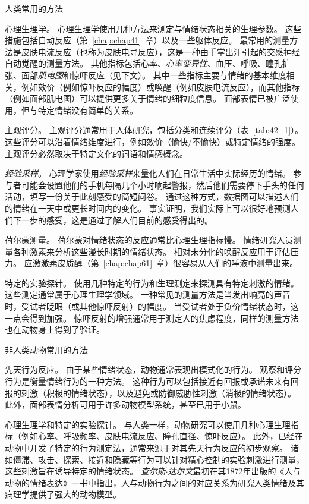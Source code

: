 \begin{proposition}[测量情绪的方法] \label{box:42_1}
	
	\quad \quad 人类常用的方法
	
	\quad \quad 心理生理学。
	心理生理学使用几种方法来测定与情绪状态相关的生理参数。
	这些措施包括自动反应（第~\ref{chap:chap41}~章）以及一些躯体反应。
	最常用的测量方法是皮肤电流反应（也称为皮肤电导反应），这是一种由手掌出汗引起的交感神经自动觉醒的测量方法。
	其他指标包括心率、\textit{心率变异性}、血压、呼吸、瞳孔扩张、面部\textit{肌电图}和惊吓反应（见下文）。
	其中一些指标主要与情绪的基本维度相关，例如效价（例如惊吓反应的幅度）或唤醒（例如皮肤电流反应），而其他指标（例如面部肌电图）可以提供更多关于情绪的细粒度信息。
	面部表情已被广泛使用，但与特定情绪没有简单的关系。
	
	\quad \quad 主观评分。
	主观评分通常用于人体研究，包括分类和连续评分（表~\ref{tab:42_1}）。
	这些评分可以沿着情绪维度进行，例如效价（愉快/不愉快）或特定情绪的强度。
	主观评分必然取决于特定文化的词语和情感概念。
	
	\quad \quad \textit{经验采样}。
	心理学家使用\textit{经验采样}来量化人们在日常生活中实际经历的情绪。
	参与者可能会设置他们的手机每隔几个小时响起警报，然后他们需要停下手头的任何活动，填写一份关于此刻感受的简短问卷。
	通过这种方式，数据图可以描述人们的情绪在一天中或更长时间内的变化。
	事实证明，我们实际上可以很好地预测人们下一步的感受，这是通过了解人们目前的感受得出的。
	
	\quad \quad 荷尔蒙测量。
	荷尔蒙对情绪状态的反应通常比心理生理指标慢。
	情绪研究人员测量各种激素来分析这些漫长时期的情绪状态。
	相对未分化的唤醒反应用于评估压力。
	应激激素皮质醇（第~\ref{chap:chap61}~章）很容易从人们的唾液中测量出来。
	
	\quad \quad 特定的实验探针。
	使用几种特定的行为和生理测定来探测具有特定刺激的情绪。
	这些测定通常属于心理生理学领域。
	一种常见的测量方法是当发出响亮的声音时，受试者眨眼（或其他惊吓反射）的幅度。
	当受试者处于负价情绪状态时，这一点会得到加强。
	惊吓反射的增强通常用于测定人的焦虑程度，同样的测量方法也在动物身上得到了验证。
	
	\quad \quad 非人类动物常用的方法
	
	\quad \quad 先天行为反应。
	由于某些情绪状态，动物通常表现出模式化的行为。
	观察和评分行为是衡量情绪行为的一种方法。
	这种行为可以包括接近有回报或承诺未来有回报的刺激（积极的情绪状态），以及避免或防御威胁性刺激（消极的情绪状态）。
	此外，面部表情分析可用于许多动物模型系统，甚至已用于小鼠。
	
	\quad \quad 心理生理学和特定的实验探针。
	与人类一样，动物研究可以使用几种心理生理指标（例如心率、呼吸频率、皮肤电流反应、瞳孔直径、惊吓反应）。
	此外，已经在动物中开发了特定的行为测定法，通常来源于对其先天行为反应的初步观察。
	诸如僵滞、攻击、探索、接近和隐藏等行为可以针对精心控制的实验刺激进行测量，这些刺激旨在诱导特定的情绪状态。
	\textit{查尔斯$\cdot$达尔文}最初在其1872年出版的《人与动物的情绪表达》一书中指出，人与动物行为之间的对应关系为研究人类情绪及其病理学提供了强大的动物模型。
	
\end{proposition}


